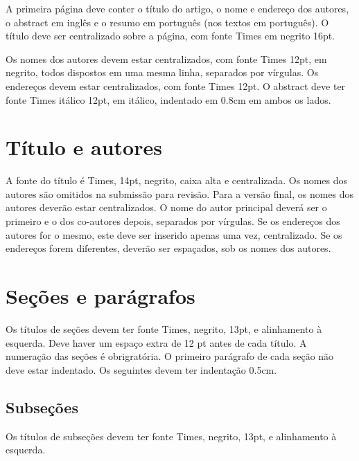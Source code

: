 \documentclass[12pt]{article}
\begin{document}
A primeira página deve conter o título do artigo, o nome e endereço
dos autores, o abstract em inglês e o resumo em português (nos textos
em português). O título deve ser centralizado sobre a página, com
fonte Times em negrito 16pt.

Os nomes dos autores devem estar centralizados, com fonte Times 12pt,
em negrito, todos dispostos em uma mesma linha, separados por
vírgulas. Os endereços devem estar centralizados, com fonte Times
12pt. O abstract deve ter fonte Times itálico 12pt, em itálico, indentado em 0.8cm
em ambos os lados.


\section{Título e autores}

A fonte do título é Times, 14pt, negrito, caixa alta e centralizada.
Os nomes dos autores são omitidos na submissão para revisão. Para a
versão final, os nomes dos autores deverão estar centralizados. O nome
do autor principal deverá ser o primeiro e o dos co-autores depois,
separados por vírgulas. Se os endereços dos autores for o mesmo, este
deve ser inserido apenas uma vez, centralizado. Se os endereços forem
diferentes, deverão ser espaçados, sob os nomes dos autores.


\section{Seções e parágrafos}

Os títulos de seções devem ter fonte Times, negrito, 13pt, e
alinhamento à esquerda. Deve haver um espaço extra de 12 pt antes de
cada título. A numeração das seções é obrigratória. O primeiro
parágrafo de cada seção não deve estar indentado. Os seguintes devem
ter indentação 0.5cm.

\subsection{Subseções}

Os títulos de subseções devem ter fonte Times, negrito, 13pt, e
alinhamento à esquerda.


\end{document}
